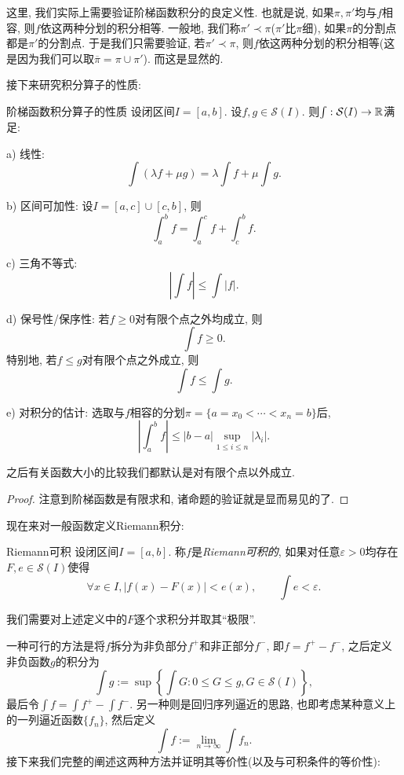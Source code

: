 这里, 我们实际上需要验证阶梯函数积分的良定义性. 也就是说, 如果$\pi, \pi '$均与$f$相容, 则$f$依这两种分划的积分相等. 一般地, 我们称$\pi ' \prec \pi$($\pi '$比$\pi$细), 如果$\pi$的分割点都是$\pi '$的分割点. 于是我们只需要验证, 若$\pi ' \prec \pi$, 则$f$依这两种分划的积分相等(这是因为我们可以取$\overline{\pi} = \pi \cup \pi '$). 而这是显然的. 

接下来研究积分算子的性质: 

\begin{proposition}{阶梯函数积分算子的性质}
	设闭区间$I=[a,b]$. 设$f,g \in \mathcal{S}(I)$. 则$\int : \mathcal{S}(I) \to \mathbb{R}$满足: 
	
	a) 线性: $$\int (\lambda f+ \mu g) = \lambda \int f + \mu \int g.$$
	
	b) 区间可加性: 设$I=[a,c] \cup [c,b]$, 则$$\int_a^b f = \int_a^c f + \int_c^b f. $$
	
	c) 三角不等式: $$\left| \int f \right| \leq \int |f|. $$
	
	d) 保号性/保序性: 若$f \geq 0$对有限个点之外均成立, 则$$\int f \geq 0. $$
	\qquad 特别地, 若$f \leq g$对有限个点之外成立, 则$$ \int f \leq  \int g.$$
	
	e) 对积分的估计: 选取与$f$相容的分划$\pi= \{ a=x_0<\cdots <x_n=b \}$后, $$\left| \int_a^b f \right| \leq |b-a| \sup_{1 \leq i \leq n} |\lambda _i|. $$
\end{proposition}
\begin{remark}
	之后有关函数大小的比较我们都默认是对有限个点以外成立. 
\end{remark}
\begin{proof}
	注意到阶梯函数是有限求和, 诸命题的验证就是显而易见的了. 
\end{proof}

现在来对一般函数定义Riemann积分: 

\begin{definition}{Riemann可积}
	设闭区间$I=[a,b]$. 称$f$是\textit{Riemann可积的}, 如果对任意$\varepsilon >0$均存在$F,e \in \mathcal{S}(I)$使得$$\forall x \in I,|f(x)-F(x)|<e(x),\qquad \int e < \varepsilon .$$
\end{definition}

我们需要对上述定义中的$F$逐个求积分并取其“极限”. 

一种可行的方法是将$f$拆分为非负部分$f^+$和非正部分$f^-$, 即$f=f^+-f^-$, 之后定义非负函数$g$的积分为$$\int g := \sup \left\{ \int G:0\leq G \leq g, G \in \mathcal{S}(I)  \right\}, $$
最后令$\int f = \int f^+ - \int f^-$. 另一种则是回归序列逼近的思路, 也即考虑某种意义上的一列逼近函数$\{ f_n \}$, 然后定义$$\int f := \lim_{n\to \infty} \int f_n.$$
接下来我们完整的阐述这两种方法并证明其等价性(以及与可积条件的等价性): 

